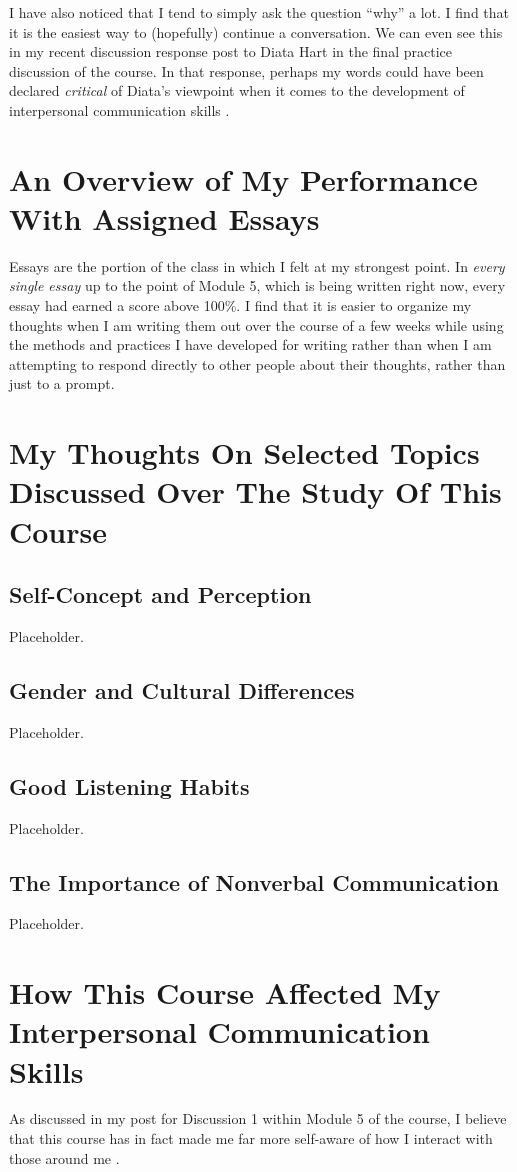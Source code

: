   I have also noticed that I tend to simply ask the question ``why'' a lot.
    I find that it is the easiest way to (hopefully) continue a conversation.
    We can even see this in my recent discussion response post to Diata Hart
    in the final practice discussion of the course. In that response, perhaps
    my words could have been declared \textit{critical} of Diata's viewpoint
    when it comes to the development of interpersonal communication skills
    \parencite{hellwig_diata_2020}.


\section{An Overview of My Performance With Assigned Essays}
  Essays are the portion of the class in which I felt at my strongest point.
    In \textit{every single essay} up to the point of Module 5, which is being
    written right now, every essay had earned a score above 100\%. I find that
    it is easier to organize my thoughts when I am writing them out over the
    course of a few weeks while using the methods and practices I have developed
    for writing rather than when I am attempting to respond directly to
    other people about their thoughts, rather than just to a prompt.


\section{My Thoughts On Selected Topics Discussed Over The Study Of This Course}
  \subsection{Self-Concept and Perception}
    Placeholder.

  \subsection{Gender and Cultural Differences}
    Placeholder.

  \subsection{Good Listening Habits}
    Placeholder.

  \subsection{The Importance of Nonverbal Communication}
    Placeholder.


\section{How This Course Affected My Interpersonal Communication Skills}
  As discussed in my post for Discussion 1 within Module 5 of the course, I
    believe that this course has in fact made me far more self-aware of how I
    interact with those around me \parencite{hellwig_m5d2_2020}.
